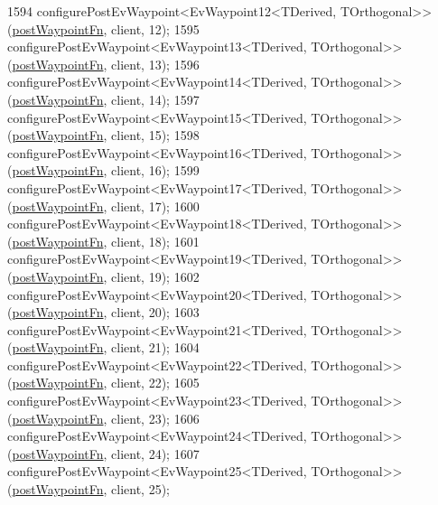 \begin{DoxyCode}
1594     configurePostEvWaypoint<EvWaypoint12<TDerived, TOrthogonal>>(\hyperlink{classcl__move__base__z_1_1WaypointEventDispatcher_a964a57fcce5d48ec60243230722d8dd7}{postWaypointFn}, client, 12);
1595     configurePostEvWaypoint<EvWaypoint13<TDerived, TOrthogonal>>(\hyperlink{classcl__move__base__z_1_1WaypointEventDispatcher_a964a57fcce5d48ec60243230722d8dd7}{postWaypointFn}, client, 13);
1596     configurePostEvWaypoint<EvWaypoint14<TDerived, TOrthogonal>>(\hyperlink{classcl__move__base__z_1_1WaypointEventDispatcher_a964a57fcce5d48ec60243230722d8dd7}{postWaypointFn}, client, 14);
1597     configurePostEvWaypoint<EvWaypoint15<TDerived, TOrthogonal>>(\hyperlink{classcl__move__base__z_1_1WaypointEventDispatcher_a964a57fcce5d48ec60243230722d8dd7}{postWaypointFn}, client, 15);
1598     configurePostEvWaypoint<EvWaypoint16<TDerived, TOrthogonal>>(\hyperlink{classcl__move__base__z_1_1WaypointEventDispatcher_a964a57fcce5d48ec60243230722d8dd7}{postWaypointFn}, client, 16);
1599     configurePostEvWaypoint<EvWaypoint17<TDerived, TOrthogonal>>(\hyperlink{classcl__move__base__z_1_1WaypointEventDispatcher_a964a57fcce5d48ec60243230722d8dd7}{postWaypointFn}, client, 17);
1600     configurePostEvWaypoint<EvWaypoint18<TDerived, TOrthogonal>>(\hyperlink{classcl__move__base__z_1_1WaypointEventDispatcher_a964a57fcce5d48ec60243230722d8dd7}{postWaypointFn}, client, 18);
1601     configurePostEvWaypoint<EvWaypoint19<TDerived, TOrthogonal>>(\hyperlink{classcl__move__base__z_1_1WaypointEventDispatcher_a964a57fcce5d48ec60243230722d8dd7}{postWaypointFn}, client, 19);
1602     configurePostEvWaypoint<EvWaypoint20<TDerived, TOrthogonal>>(\hyperlink{classcl__move__base__z_1_1WaypointEventDispatcher_a964a57fcce5d48ec60243230722d8dd7}{postWaypointFn}, client, 20);
1603     configurePostEvWaypoint<EvWaypoint21<TDerived, TOrthogonal>>(\hyperlink{classcl__move__base__z_1_1WaypointEventDispatcher_a964a57fcce5d48ec60243230722d8dd7}{postWaypointFn}, client, 21);
1604     configurePostEvWaypoint<EvWaypoint22<TDerived, TOrthogonal>>(\hyperlink{classcl__move__base__z_1_1WaypointEventDispatcher_a964a57fcce5d48ec60243230722d8dd7}{postWaypointFn}, client, 22);
1605     configurePostEvWaypoint<EvWaypoint23<TDerived, TOrthogonal>>(\hyperlink{classcl__move__base__z_1_1WaypointEventDispatcher_a964a57fcce5d48ec60243230722d8dd7}{postWaypointFn}, client, 23);
1606     configurePostEvWaypoint<EvWaypoint24<TDerived, TOrthogonal>>(\hyperlink{classcl__move__base__z_1_1WaypointEventDispatcher_a964a57fcce5d48ec60243230722d8dd7}{postWaypointFn}, client, 24);
1607     configurePostEvWaypoint<EvWaypoint25<TDerived, TOrthogonal>>(\hyperlink{classcl__move__base__z_1_1WaypointEventDispatcher_a964a57fcce5d48ec60243230722d8dd7}{postWaypointFn}, client, 25);

\end{DoxyCode}
